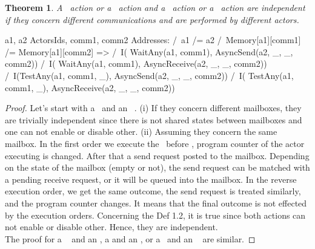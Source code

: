 \documentclass[a4paper,11pt]{article}
\theoremstyle{break}
\newtheorem{theorem}{Theorem}[section]
\begin{document}
\begin{theorem}
A \wait~action or a \test~action and a \asynsend~action or a \asynreceive~action are independent if they concern different communications and are performed by different actors. 
\end{theorem}
\begin{tla}
\forall a1, a2 \in ActorsIds, comm1, comm2 \in Addresses:
	/\ a1 /= a2
	/\ Memory[a1][comm1] /=   Memory[a1][comm2]
	=>  /\ I( WaitAny(a1, {comm1}), AsyncSend(a2, _, _, comm2)) 
            /\ I( WaitAny(a1, {comm1}), AsyncReceive(a2, _, _, comm2)) 
            /\ I(TestAny(a1, {comm1}, _), AsyncSend(a2, _, _, comm2))
            /\ I( TestAny(a1, {comm1}, _), AsyncReceive(a2, _, _, comm2))             
\end{tla}
\begin{tlatex}
%
\end{tlatex}

\begin{proof}
Let's start with a \wait~and an \asynsend~. (i) If they concern different mailboxes, they are trivially independent since there is not shared states between mailboxes and one can not enable or disable other. (ii) Assuming they concern the same mailbox. In the first order we execute the \wait~before \asynsend, program counter of the actor executing \wait is changed. After that a send request posted to the mailbox. Depending on the state of the mailbox (empty or not), the send request can be matched with a pending receive request, or it will be queued into the mailbox. In the reverse execution order, we get the same outcome, the send request is treated similarly, and the program counter changes. It means that the final outcome is not effected by the execution orders. Concerning the Def 1.2, it is true since both actions can not enable or disable other. Hence, they are independent. \\
The proof for a \wait~ and an \asynreceive, a \test and an \asynsend, or a \test~and an \asynreceive~ are similar. 
 
\end{proof}
\end{document}
